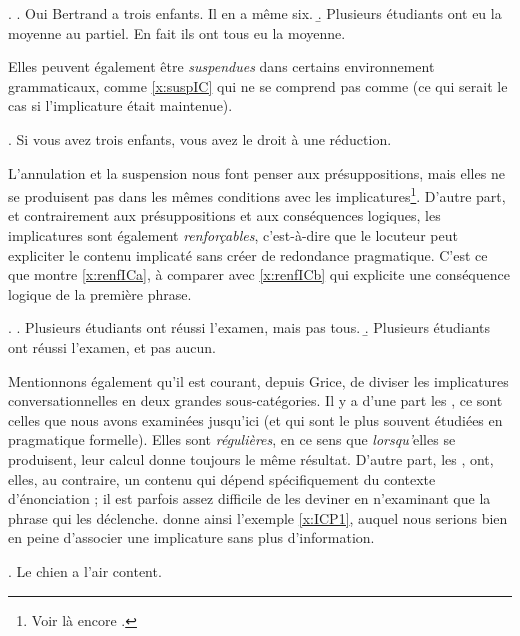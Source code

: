 \begin{refsegment}
\ex.
\a. Oui Bertrand a trois enfants. Il en a même six.   
\b. Plusieurs étudiants ont eu la moyenne au partiel.  En fait ils ont tous eu la moyenne.


Elles peuvent également être \emph{suspendues} dans certains environnement grammaticaux, comme %
\ref{x:suspIC} qui ne se comprend pas comme  (ce qui serait le cas si l'implicature était maintenue).

\ex. \label{x:suspIC}
Si vous avez trois enfants, vous avez le droit à une réduction.


L'annulation et la suspension nous font penser aux présuppositions, mais elles ne se produisent pas dans les mêmes conditions avec les implicatures\footnote{Voir là encore \citet{Amsili:07}.}. D'autre part, et contrairement aux présuppositions et aux conséquences logiques, les implicatures sont également \emph{renforçables}, c'est-à-dire que le locuteur peut expliciter le contenu implicaté sans créer de redondance pragmatique.  C'est ce que montre \ref{x:renfICa}, à comparer avec \ref{x:renfICb} qui explicite une conséquence logique de la première phrase.

\ex. 
\a.  
Plusieurs étudiants ont réussi l'examen, mais pas tous. \label{x:renfICa}
\b.  Plusieurs étudiants ont réussi l'examen, \zarb et pas aucun. \label{x:renfICb}


Mentionnons également qu'il est courant, depuis Grice, de diviser les implicatures conversationnelles en deux grandes sous-catégories.  Il y a d'une part les , ce sont celles que nous avons examinées jusqu'ici (et qui sont le plus souvent étudiées en pragmatique formelle). Elles sont \emph{régulières}, en ce sens que \emph{lorsqu'}elles se produisent, leur calcul donne toujours le même résultat.
D'autre part, les , ont, elles, au contraire, un contenu qui dépend spécifiquement du contexte d'énonciation ; il est parfois assez difficile de les deviner en n'examinant que la phrase qui les déclenche.  \citet{Levinson:83} donne ainsi l'exemple \ref{x:ICP1}, auquel nous serions bien en peine d'associer une implicature sans plus d'information.

\ex. \label{x:ICP1}
Le chien a l'air content.


\end{refsegment}
